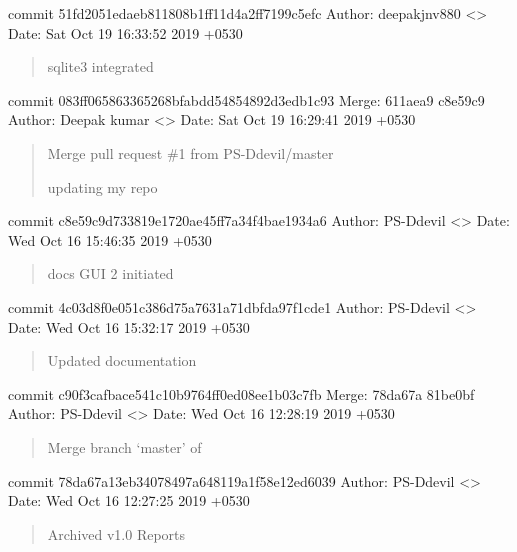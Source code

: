 \documentclass[letterpaper,10pt,english]{sphinxmanual}
\begin{document}
commit 51fd2051edaeb811808b1ff11d4a2ff7199c5efc
Author: deepakjnv880 \textless{}\textgreater{}
Date:   Sat Oct 19 16:33:52 2019 +0530
\begin{quote}

sqlite3 integrated
\end{quote}

commit 083ff065863365268bfabdd54854892d3edb1c93
Merge: 611aea9 c8e59c9
Author: Deepak kumar \textless{}\textgreater{}
Date:   Sat Oct 19 16:29:41 2019 +0530
\begin{quote}

Merge pull request \#1 from PS-Ddevil/master

updating my repo
\end{quote}

commit c8e59c9d733819e1720ae45ff7a34f4bae1934a6
Author: PS-Ddevil \textless{}\textgreater{}
Date:   Wed Oct 16 15:46:35 2019 +0530
\begin{quote}

docs GUI 2 initiated
\end{quote}

commit 4c03d8f0e051c386d75a7631a71dbfda97f1cde1
Author: PS-Ddevil \textless{}\textgreater{}
Date:   Wed Oct 16 15:32:17 2019 +0530
\begin{quote}

Updated documentation
\end{quote}

commit c90f3cafbace541c10b9764ff0ed08ee1b03c7fb
Merge: 78da67a 81be0bf
Author: PS-Ddevil \textless{}\textgreater{}
Date:   Wed Oct 16 12:28:19 2019 +0530
\begin{quote}

Merge branch ‘master’ of 
\end{quote}

commit 78da67a13eb34078497a648119a1f58e12ed6039
Author: PS-Ddevil \textless{}\textgreater{}
Date:   Wed Oct 16 12:27:25 2019 +0530
\begin{quote}

Archived v1.0 Reports
\end{quote}
\end{document}
